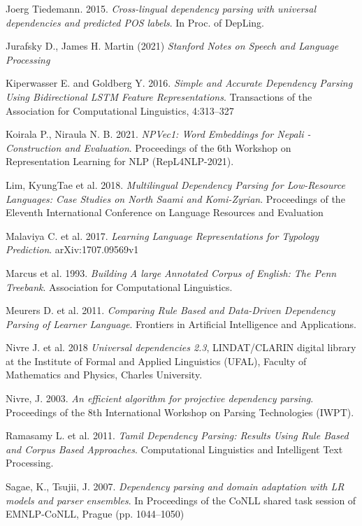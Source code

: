 \begin{thebibliography}{}
Joerg Tiedemann. 2015. \textit{Cross-lingual dependency parsing with universal dependencies and predicted POS labels}. In Proc. of DepLing.

Jurafsky D., James H. Martin (2021) \textit{Stanford Notes on Speech and Language Processing}

Kiperwasser E. and Goldberg Y. 2016. \textit{Simple and Accurate Dependency Parsing Using Bidirectional LSTM Feature Representations}. Transactions of the Association for Computational Linguistics, 4:313--327

Koirala P., Niraula N. B. 2021. \textit{NPVec1: Word Embeddings for Nepali - Construction and Evaluation}. Proceedings of the 6th Workshop on Representation Learning for NLP (RepL4NLP-2021).

Lim, KyungTae et al. 2018. \textit{Multilingual Dependency Parsing for
Low-Resource Languages: Case Studies on North Saami and
{K}omi-{Z}yrian}. Proceedings of the Eleventh International Conference on
Language Resources and Evaluation

Malaviya C. et al. 2017. \textit{Learning Language Representations for Typology Prediction}. arXiv:1707.09569v1

Marcus et al. 1993. \textit{Building A large Annotated Corpus of English: The Penn Treebank}. Association for Computational Linguistics.

Meurers D. et al. 2011. \textit{Comparing Rule Based and Data-Driven Dependency Parsing of Learner Language}. Frontiers in Artificial Intelligence and Applications.

Nivre J. et al. 2018 \textit{Universal dependencies 2.3}, LINDAT/CLARIN
digital library at the Institute of Formal and Applied Linguistics (UFAL),
Faculty of Mathematics and Physics, Charles University.

Nivre, J. 2003. \textit{An efficient algorithm for projective dependency parsing}. Proceedings of the 8th International Workshop on Parsing Technologies (IWPT).

Ramasamy L. et al. 2011. \textit{Tamil Dependency Parsing: Results Using Rule Based and Corpus Based Approaches}. Computational Linguistics and Intelligent Text Processing.

Sagae, K., Tsujii, J. 2007. \textit{Dependency parsing and domain adaptation with LR models and
parser ensembles}. In Proceedings of the CoNLL shared task session of EMNLP-CoNLL, Prague
(pp. 1044–1050)


\end{thebibliography}
